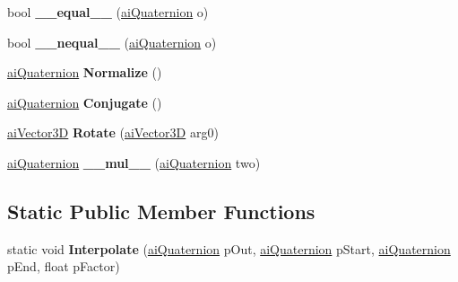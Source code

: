 \begin{DoxyCompactItemize}
\item 
\hypertarget{structai_quaternion_ac6d242355a159b056b4ce780caf57fc2}{bool {\bfseries \+\_\+\+\_\+equal\+\_\+\+\_\+} (\hyperlink{structai_quaternion}{ai\+Quaternion} o)}\label{structai_quaternion_ac6d242355a159b056b4ce780caf57fc2}

\item 
\hypertarget{structai_quaternion_a171417e6d89593569258036c9449082f}{bool {\bfseries \+\_\+\+\_\+nequal\+\_\+\+\_\+} (\hyperlink{structai_quaternion}{ai\+Quaternion} o)}\label{structai_quaternion_a171417e6d89593569258036c9449082f}

\item 
\hypertarget{structai_quaternion_ab444f6fd5b9e387769f8f6d16ed61fe5}{\hyperlink{structai_quaternion}{ai\+Quaternion} {\bfseries Normalize} ()}\label{structai_quaternion_ab444f6fd5b9e387769f8f6d16ed61fe5}

\item 
\hypertarget{structai_quaternion_a7161ba7d983bd0603e0de47bdea2fab2}{\hyperlink{structai_quaternion}{ai\+Quaternion} {\bfseries Conjugate} ()}\label{structai_quaternion_a7161ba7d983bd0603e0de47bdea2fab2}

\item 
\hypertarget{structai_quaternion_a680f9512e75f9935b5921b684b564639}{\hyperlink{structai_vector3_d}{ai\+Vector3\+D} {\bfseries Rotate} (\hyperlink{structai_vector3_d}{ai\+Vector3\+D} arg0)}\label{structai_quaternion_a680f9512e75f9935b5921b684b564639}

\item 
\hypertarget{structai_quaternion_aef666a0e89a42550ec146f82dadee900}{\hyperlink{structai_quaternion}{ai\+Quaternion} {\bfseries \+\_\+\+\_\+mul\+\_\+\+\_\+} (\hyperlink{structai_quaternion}{ai\+Quaternion} two)}\label{structai_quaternion_aef666a0e89a42550ec146f82dadee900}

\end{DoxyCompactItemize}
\subsection*{Static Public Member Functions}
\begin{DoxyCompactItemize}
\item 
\hypertarget{structai_quaternion_aa30284e42de73fe3166ab828ae2f6601}{static void {\bfseries Interpolate} (\hyperlink{structai_quaternion}{ai\+Quaternion} p\+Out, \hyperlink{structai_quaternion}{ai\+Quaternion} p\+Start, \hyperlink{structai_quaternion}{ai\+Quaternion} p\+End, float p\+Factor)}\label{structai_quaternion_aa30284e42de73fe3166ab828ae2f6601}

\end{DoxyCompactItemize}
